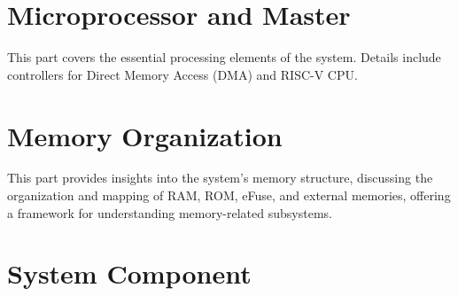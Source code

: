 \documentclass[openany, 10pt]{book}
\begin{document}
\setenglishformatting




\clearpage

\clearpage


\tableofcontents
\clearpage
\listoftables
\clearpage
\listoffigures





\part{Microprocessor and Master}


This part covers the essential processing elements of the system. Details include controllers for Direct Memory Access (DMA) and RISC-V CPU.


\part{Memory Organization}

This part provides insights into the system's memory structure, discussing the organization and mapping of RAM, ROM, eFuse, and external memories, offering a framework for understanding memory-related subsystems.


\part{System Component}

\end{document}
